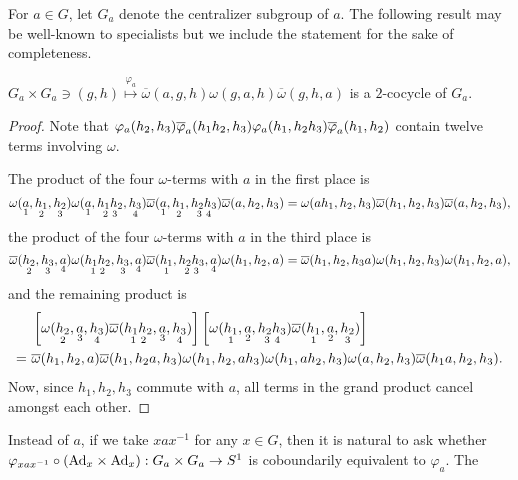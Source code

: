 For $a \in G$, let $G_a$  denote the centralizer subgroup of $a$.
The following result may be well-known to specialists but we include the statement for the sake of completeness.  
\begin{lem}\label{2coc}
	$G_a \times G_a \ni (g,h) \stackrel{\varphi_a}{\longmapsto} \overline{\omega}(a,g,h)\omega(g,a,h)\overline{\omega}(g,h,a) $ is a $2$-cocycle of $G_a$.
\end{lem}
\begin{proof}
Note that $\varphi_a (h_2,h_3)\overline{ \varphi}_a (h_1h_2,h_3) \varphi_a (h_1,h_2h_3)\overline{ \varphi}_a (h_1,h_2)$ contain twelve terms involving $\omega$.

The product of the four $\omega$-terms with $a$ in the first place is
\[
{\omega} (\underset{1}{a},\underset{2}{h_1},\underset{3}{h_2}) {\omega} (\underset{1}{a},\underset{2~3}{h_1h_2},\underset{4}{h_3}) \overline{ \omega} (\underset{1}{a},\underset{2}{h_1},\underset{3~4}{h_2h_3}) \overline{\omega} (a,h_2,h_3) = {\omega} (ah_1,h_2,h_3) \overline{\omega} (h_1,h_2,h_3) \overline{\omega} (a,h_2,h_3),
\]
the product of the four $\omega$-terms with $a$ in the third place is
\[
\overline{\omega} (\underset{2}{h_2},\underset{3}{h_3},\underset{4}{a}) \omega(\underset{1~2}{h_1h_2}, \underset{3}{h_3}, \underset{4}{a}) \overline{\omega}(\underset{1}{h_1},\underset{2~3}{h_2h_3},\underset{4}{a}) \omega(h_1,h_2,a) = \overline{\omega}(h_1,h_2,h_3a) \omega(h_1,h_2,h_3)  \omega(h_1,h_2,a),
\]
and the remaining product is
\begin{align*}
& \left[\omega(\underset{2}{h_2},\underset{3}{a},\underset{4}{h_3}) \overline{\omega}(\underset{1~2}{h_1h_2},\underset{3}{a},\underset{4}{h_3})\right] \left[\omega(\underset{1}{h_1},\underset{2}{a},\underset{3~4}{h_2h_3}) \overline{\omega}(\underset{1}{h_1},\underset{2}{a},\underset{3}{h_2})\right]\\
= ~ & \overline{\omega}(h_1,h_2,a)\overline{\omega}(h_1,h_2a,h_3)\omega(h_1,h_2,ah_3) \omega(h_1,ah_2,h_3) \omega(a,h_2,h_3) \overline{\omega}(h_1a,h_2,h_3).
\end{align*}
Now, since $h_1,h_2,h_3$ commute with $a$, all terms in the grand product cancel amongst each other.
\end{proof}
Instead of $a$, if we take $xax^{-1}$ for any $x \in G$, then it is natural to ask whether ${\varphi}_{xax^{-1}} \circ ({\mbox{Ad}}_x \times {\mbox{Ad}}_x) : G_a \times G_a \rightarrow S^1$ is coboundarily equivalent to $\varphi_a$. The

